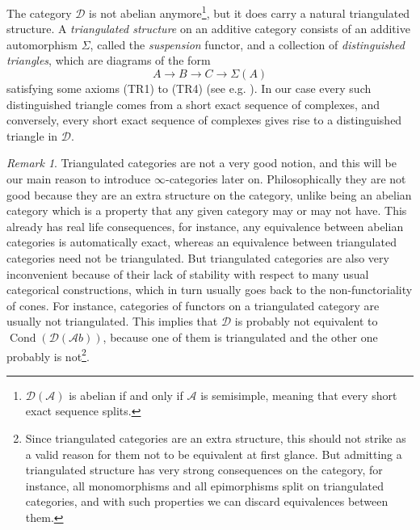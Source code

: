 \documentclass[11pt,A4]{article}
\theoremstyle{plain}
\theoremstyle{definition}
\theoremstyle{remark}
\newtheorem{rem}[thm]{Remark}
\newcommand{\1}{\mathbbm{1}}
\newcommand{\Ab}{\mathscr{A}b}
\newcommand{\D}{\mathscr{D}}
\DeclareMathOperator{\Cond}{Cond}
\begin{document}
The category $\D$ is not abelian anymore\footnote{$\D(\mathscr{A})$ is abelian if and only if $\mathscr{A}$ is semisimple, meaning that every short exact sequence splits.}, but it does carry a natural triangulated structure.
A \textit{triangulated structure} on an additive category consists of an additive automorphism $\Sigma$, called the \textit{suspension} functor, and a collection of \textit{distinguished triangles}, which are diagrams of the form
\[ A\to B\to C\to\Sigma(A) \]
satisfying some axioms (TR1) to (TR4) (see e.g. \cite{gm03}).
In our case every such distinguished triangle comes from a short exact sequence of complexes, and conversely, every short exact sequence of complexes gives rise to a distinguished triangle in $\D$.

\begin{rem}
    Triangulated categories are not a very good notion, and this will be our main reason to introduce $\infty$-categories later on.
    Philosophically they are not good because they are an extra structure on the category, unlike being an abelian category which is a property that any given category may or may not have.
    This already has real life consequences, for instance, any equivalence between abelian categories is automatically exact, whereas an equivalence between triangulated categories need not be triangulated.
    But triangulated categories are also very inconvenient because of their lack of stability with respect to many usual categorical constructions, which in turn usually goes back to the non-functoriality of cones.
    For instance, categories of functors on a triangulated category are usually not triangulated.
    This implies that $\D$ is probably not equivalent to $\Cond(\D(\Ab))$, because one of them is triangulated and the other one probably is not\footnote{Since triangulated categories are an extra structure, this should not strike as a valid reason for them not to be equivalent at first glance. But admitting a triangulated structure has very strong consequences on the category, for instance, all monomorphisms and all epimorphisms split on triangulated categories, and with such properties we can discard equivalences between them.}.
\end{rem}
\end{document}
